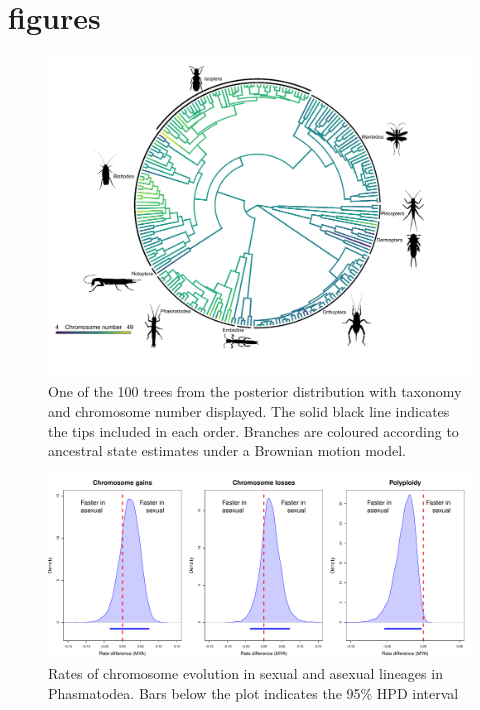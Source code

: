\section{figures}

\begin{figure}[h]
\centering \includegraphics[width=1\textwidth]{figures/phylogenetic_tree.pdf}
\caption{
One of the 100 trees from the posterior distribution with taxonomy and chromosome number displayed. The solid black line indicates the tips included in each order. Branches are coloured according to ancestral state estimates under a Brownian motion model. 
}
\label{fig:phyloplot}
\end{figure}

\begin{figure}
\centering \includegraphics[width=1\textwidth]{figures/phasmatodea_sex_asex_plot.pdf}
\caption{Rates of chromosome evolution in sexual and asexual lineages in Phasmatodea. Bars below the plot indicates the 95\% HPD interval}
\label{fig:phas.plot}
\end{figure}

